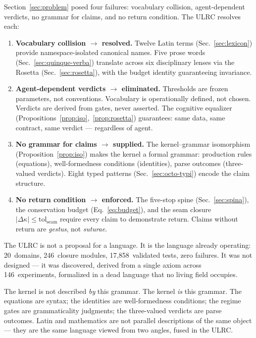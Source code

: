 \documentclass[
  aps,
  prd,
  twocolumn,
  superscriptaddress,
  nofootinbib,
  floatfix
]{revtex4-2}
\newcommand{\tolseam}{\mathrm{tol}_{\mathrm{seam}}}
\newcommand{\Logint}{\kappa}
\newcommand{\lat}[1]{\textit{#1}}
\begin{document}
Section~\ref{sec:problem} posed four failures: vocabulary
collision, agent-dependent verdicts, no grammar for claims, and
no return condition. The ULRC resolves each:

\begin{enumerate}[nosep,leftmargin=*]
\item \textbf{Vocabulary collision $\to$ resolved.}
  Twelve Latin terms (Sec.~\ref{sec:lexicon}) provide
  namespace-isolated canonical names. Five prose words
  (Sec.~\ref{sec:quinque-verba}) translate across six
  disciplinary lenses via the Rosetta
  (Sec.~\ref{sec:rosetta}), with the budget identity
  guaranteeing invariance.

\item \textbf{Agent-dependent verdicts $\to$ eliminated.}
  Thresholds are frozen parameters, not conventions.
  Vocabulary is operationally defined, not chosen.
  Verdicts are derived from gates, never asserted.
  The cognitive equalizer
  (Propositions~\ref{prop:iso},~\ref{prop:rosetta})
  guarantees: same data, same contract, same verdict ---
  regardless of agent.

\item \textbf{No grammar for claims $\to$ supplied.}
  The kernel--grammar isomorphism
  (Proposition~\ref{prop:iso}) makes the kernel a formal
  grammar: production rules (equations), well-formedness
  conditions (identities), parse outcomes (three-valued
  verdicts). Eight typed patterns
  (Sec.~\ref{sec:octo-typi}) encode the claim structure.

\item \textbf{No return condition $\to$ enforced.}
  The five-stop spine (Sec.~\ref{sec:spina}), the
  conservation budget (Eq.~\ref{eq:budget}), and the seam
  closure $|\Delta\Logint| \leq \tolseam$ require every
  claim to demonstrate return. Claims without return are
  \lat{gestus}, not \lat{suturae}.
\end{enumerate}

\noindent
The ULRC is not a proposal for a language. It is the language
already operating: 20~domains, 246~closure modules,
17,858~validated tests, zero failures. It was not designed ---
it was discovered, derived from a single axiom across
146~experiments, formalized in a dead language that no living
field occupies.

The kernel is not described \emph{by} this grammar. The kernel
\emph{is} this grammar. The equations are syntax; the identities
are well-formedness conditions; the regime gates are
grammaticality judgments; the three-valued verdicts are parse
outcomes. Latin and mathematics are not parallel descriptions
of the same object --- they are the same language viewed from
two angles, fused in the ULRC.
\end{document}
